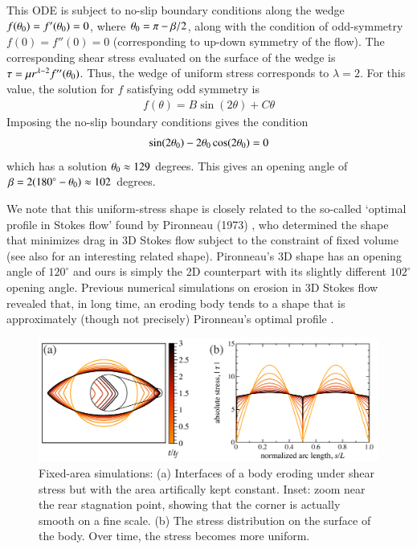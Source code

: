 \documentclass[preprint, 10pt]{elsarticle}
\begin{document}
This ODE is subject to no-slip boundary conditions along the wedge $f(\theta_0) = f'(\theta_0) = 0$, where $\theta_0 = \pi - \beta/2$, along with the condition of odd-symmetry $f(0) = f''(0) = 0$ (corresponding to up-down symmetry of the flow).  The corresponding shear stress evaluated on the surface of the wedge is $\tau = \mu r^{\lambda-2} f''(\theta_0)$. Thus, the wedge of uniform stress corresponds to $\lambda = 2$. For this value, the solution for $f$ satisfying odd symmetry is
\begin{align*}
  f(\theta) = B \sin (2 \theta) + C \theta
\end{align*}
Imposing the no-slip boundary conditions gives the condition
\begin{align*}
  \sin(2 \theta_0) - 2 \theta_0 \cos(2 \theta_0) = 0
\end{align*}
which has a solution $\theta_0 \approx 129$ degrees. This gives an opening angle of $\beta = 2(180^{\circ} - \theta_0) \approx 102$ degrees. 


 
We note that this uniform-stress shape is closely related to the so-called `optimal profile in Stokes flow' found by Pironneau (1973) \cite{pir1973}, who determined the shape that minimizes drag in 3D Stokes flow subject to the constraint of fixed volume (see also \cite{mon-lau2015} for an interesting related shape). Pironneau's 3D shape has an opening angle of $120^{\circ}$ and ours is simply the 2D counterpart with its slightly different $102^{\circ}$ opening angle. Previous numerical simulations on erosion in 3D Stokes flow revealed that, in long time, an eroding body tends to a shape that is approximately (though not precisely) Pironneau's optimal profile \cite{mit-spa2016}.

\begin{figure}%
\begin{center}
\includegraphics[width = 0.85 \textwidth]{./figs/fixed_intface.pdf}
\caption{Fixed-area simulations: (a) Interfaces of a body eroding under shear stress but with the area artifically kept constant. Inset: zoom near the rear stagnation point, showing that the corner is actually smooth on a fine scale. (b) The stress distribution on the surface of the body. Over time, the stress becomes more uniform.}
\label{fixed_intface}
\end{center}
\end{figure}
\end{document}

